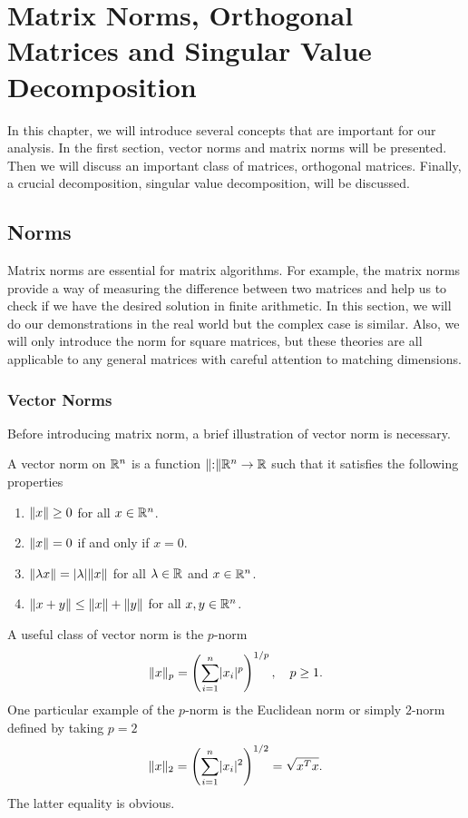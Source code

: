 \chapter{Matrix Norms, Orthogonal Matrices and Singular Value Decomposition}\label{chap:norms}

In this chapter, we will introduce several concepts that are important for our analysis. In the first section, vector norms and matrix norms will be presented. Then we will discuss an important class of matrices, orthogonal matrices. Finally, a crucial decomposition, singular value decomposition, will be discussed. 

\section{Norms}\label{sec:norm}

Matrix norms are essential for matrix algorithms. For example, the matrix norms provide a way of measuring the difference between two matrices and help us to check if we have the desired solution in finite arithmetic. In this section, we will do our demonstrations in the real world but the complex case is similar. Also, we will only introduce the norm for square matrices, but these theories are all applicable to any general matrices with careful attention to matching dimensions.

\subsection{Vector Norms}\label{sec:vector-norm}

Before introducing matrix norm, a brief illustration of vector norm is necessary. 
\begin{definition}
  A vector norm on $\mathbb{R}^n$ is a function $\|{:}\| \mathbb{R}^n \to \mathbb{R}$ such that it satisfies the following properties
  \begin{enumerate}
    \item $\|{x}\| \geq 0$ for all $x\in\mathbb{R}^n$.
    \item $\|{x}\| = 0$ if and only if $x = 0$.
    \item $\|{\lambda x}\| = \lvert\lambda\rvert \|{x}\|$ for all $\lambda \in \mathbb{R}$ and $x \in \mathbb{R}^n$.
    \item $\|{x + y}\| \leq \|{x}\| + \|{y}\|$ for all $x,y\in \mathbb{R}^n$.
  \end{enumerate}
\end{definition}

\begin{example}
  A useful class of vector norm is the $p$-norm 
  \begin{equation}\notag
    \|{x}\|_p = \left({\sum_{i = 1}^n \lvert x_i\rvert^p}\right)^{1/p},\quad p\geq 1.
  \end{equation}
  One particular example of the $p$-norm is the Euclidean norm or simply $2$-norm defined by taking $p=2$
  \begin{equation}\notag
    \|{x}\|_2 =  \left({\sum_{i = 1}^n \lvert x_i\rvert^2}\right)^{1/2} = \sqrt{x^T x}.
  \end{equation}
  The latter equality is obvious.
\end{example}

